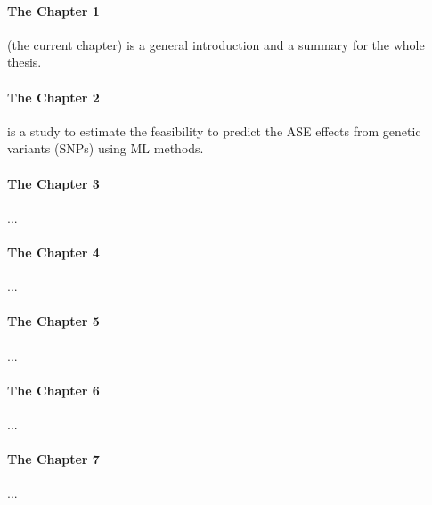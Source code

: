 \documentclass[12pt,usletter,fancy]{elegantbook}
\begin{document}
\paragraph*{The Chapter 1}(the current chapter) is a general introduction and a summary for the whole thesis.
\paragraph*{The Chapter 2} is a study to estimate the feasibility to predict the ASE effects from genetic variants (SNPs) using ML methods.
\paragraph*{The Chapter 3}...
\paragraph*{The Chapter 4}...
\paragraph*{The Chapter 5}...
\paragraph*{The Chapter 6}...
\paragraph*{The Chapter 7}...
\end{document}
